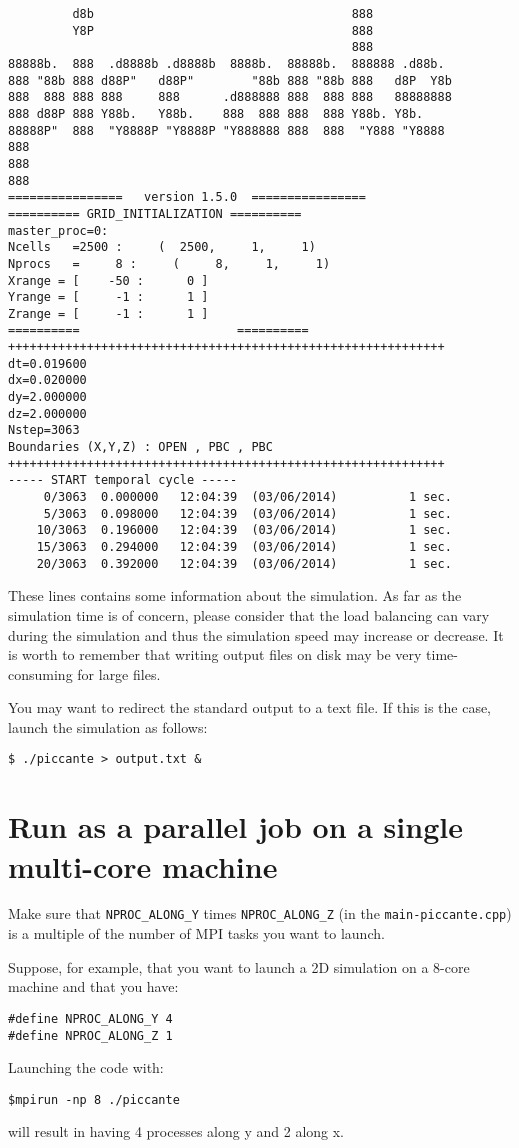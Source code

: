 \documentclass[11pt,a4paper]{report}
\begin{document}
\begin{verbatim}
         d8b                                    888
         Y8P                                    888
                                                888
88888b.  888  .d8888b .d8888b  8888b.  88888b.  888888 .d88b.
888 "88b 888 d88P"   d88P"        "88b 888 "88b 888   d8P  Y8b
888  888 888 888     888      .d888888 888  888 888   88888888
888 d88P 888 Y88b.   Y88b.    888  888 888  888 Y88b. Y8b.
88888P"  888  "Y8888P "Y8888P "Y888888 888  888  "Y888 "Y8888
888
888
888
================   version 1.5.0  ================
========== GRID_INITIALIZATION ==========
master_proc=0:
Ncells   =2500 :     (  2500,     1,     1)
Nprocs   =     8 :     (     8,     1,     1)
Xrange = [    -50 :      0 ]
Yrange = [     -1 :      1 ]
Zrange = [     -1 :      1 ]
==========                      ==========
+++++++++++++++++++++++++++++++++++++++++++++++++++++++++++++
dt=0.019600
dx=0.020000
dy=2.000000
dz=2.000000
Nstep=3063
Boundaries (X,Y,Z) : OPEN , PBC , PBC
+++++++++++++++++++++++++++++++++++++++++++++++++++++++++++++
----- START temporal cycle -----
     0/3063  0.000000   12:04:39  (03/06/2014)          1 sec.
     5/3063  0.098000   12:04:39  (03/06/2014)          1 sec.
    10/3063  0.196000   12:04:39  (03/06/2014)          1 sec.
    15/3063  0.294000   12:04:39  (03/06/2014)          1 sec.
    20/3063  0.392000   12:04:39  (03/06/2014)          1 sec.
\end{verbatim}
These lines contains some information about the simulation. As far as the simulation time is of concern, please consider that the load balancing can vary during the simulation and thus the simulation speed may increase or decrease. It is worth to remember that writing output files on disk may be very time-consuming for large files.

You may want to redirect the standard output to a text file. If this is the case, launch the simulation as follows:
\begin{verbatim}
$ ./piccante > output.txt &
\end{verbatim}

\section{Run as a parallel job on a single multi-core machine}
Make sure that \verb+NPROC_ALONG_Y+ times  \verb+NPROC_ALONG_Z+ (in the \verb+main-piccante.cpp+) is a multiple of the number of MPI tasks you want to launch.

Suppose, for example, that you want to launch a 2D simulation on a 8-core machine and that you have:
\begin{lstlisting}
#define NPROC_ALONG_Y 4
#define NPROC_ALONG_Z 1
\end{lstlisting}
Launching the code with:
\begin{verbatim}
$mpirun -np 8 ./piccante
\end{verbatim}
will result in having 4 processes along y and 2 along x.
\end{document}

